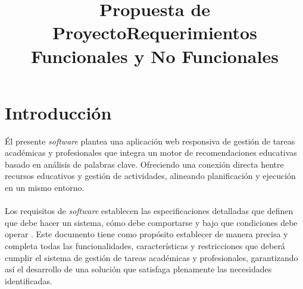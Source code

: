 \documentclass[11pt]{article}
\title{Propuesta de Proyecto}
\title{Requerimientos Funcionales y No Funcionales}
\begin{document}

                                                     



\section{Introducción}
Él presente \textit{software} plantea una aplicación web responsiva de gestión de tareas académicas y profesionales que integra
 un motor de recomendaciones educativas basado en análisis de palabras clave. Ofreciendo una conexión directa hentre recursos educativos y 
 gestión de actividades, alineando planificación y ejecución en un mismo entorno.\\\\
 Los requisitos de \textit{software} establecen las especificaciones detalladas que definen que debe hacer un sistema, cómo debe 
 comportarse y bajo que condiciones debe operar \autocite{Requirements2024}. Este documento  tiene como propósito establecer de
 manera precisa y completa todas las funcionalidades, características y restricciones que deberá cumplir el sistema de gestión de
 tareas académicas y profesionales, garantizando así el desarrollo de una solución que satisfaga plenamente las necesidades identificadas. 
\end{document}
